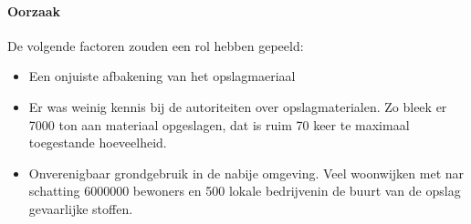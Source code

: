 \documentclass{article}
\begin{document}
	\paragraph{Oorzaak}
	
	De volgende factoren zouden een rol hebben gepeeld:
	\begin{itemize}
		\item Een onjuiste afbakening van het opslagmaeriaal
		\item Er was  weinig kennis bij de autoriteiten over  opslagmaterialen. Zo bleek er 7000 ton aan materiaal opgeslagen, dat is ruim 70 keer te maximaal toegestande hoeveelheid. 
		\item Onverenigbaar grondgebruik in de nabije omgeving. Veel woonwijken met nar schatting 6000000 bewoners en 500 lokale bedrijvenin de buurt van de opslag gevaarlijke stoffen.
	\end{itemize}
	
\end{document}
